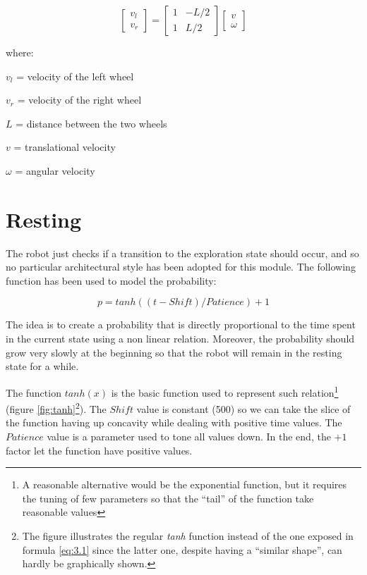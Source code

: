 \begin{equation}
\begin{bmatrix} 
v_l \\
v_r
\end{bmatrix}
=
\begin{bmatrix} 
1 & -L/2 \\
1 & L/2
\end{bmatrix}
\begin{bmatrix} 
v \\
\omega
\end{bmatrix}
\tag{3.0}\label{eq:3.0}
\end{equation}

\noindent
where:

\smallskip
\noindent
$v_l$ = velocity of the left wheel

\noindent
$v_r$ = velocity of the right wheel

\noindent
$L$ = distance between the two wheels

\noindent
$v$ = translational velocity

\noindent
$\omega$ = angular velocity

\section{Resting}

The robot just checks if a transition to the exploration state should occur, and so no particular architectural style has been adopted for this module. The following function has been used to model the probability:

\begin{equation}
    p = tanh((t - Shift) / Patience) + 1 \tag{3.1}\label{eq:3.1}
\end{equation}

\noindent
The idea is to create a probability that is directly proportional to the time spent in the current state using a non linear relation. Moreover, the probability should grow very slowly at the beginning so that the robot will remain in the resting state for a while. 

\noindent
The function $tanh(x)$ is the basic function used to represent such relation\footnote{A reasonable alternative would be the exponential function, but it requires the tuning of few parameters so that the ``tail'' of the function take reasonable values} (figure \ref{fig:tanh}\footnote{The figure illustrates the regular \textit{tanh} function instead of the one exposed in formula \ref{eq:3.1} since the latter one, despite having a ``similar shape'', can hardly be graphically shown.}). The $Shift$ value is constant (500) so we can take the slice of the function having up concavity while dealing with positive time values. The $Patience$ value is a parameter used to tone all values down. In the end, the $+1$ factor let the function have positive values.  

